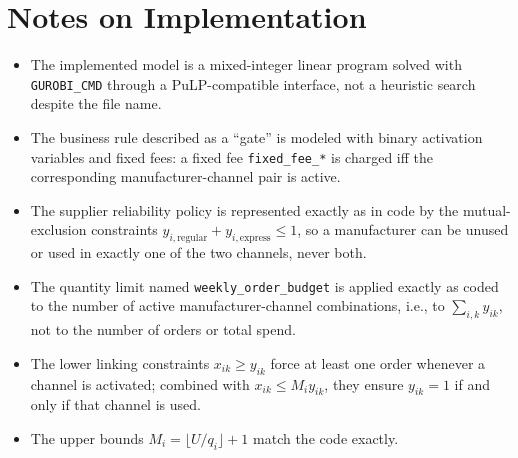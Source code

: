 \section*{Notes on Implementation}

\begin{itemize}
    \item The implemented model is a mixed-integer linear program solved with \texttt{GUROBI\_CMD} through a PuLP-compatible interface, not a heuristic search despite the file name.
    \item The business rule described as a ``gate'' is modeled with binary activation variables and fixed fees: a fixed fee \texttt{fixed\_fee\_*} is charged iff the corresponding manufacturer-channel pair is active.
    \item The supplier reliability policy is represented exactly as in code by the mutual-exclusion constraints
    \(
    y_{i,\mathrm{regular}} + y_{i,\mathrm{express}} \le 1
    \),
    so a manufacturer can be unused or used in exactly one of the two channels, never both.
    \item The quantity limit named \texttt{weekly\_order\_budget} is applied exactly as coded to the number of active manufacturer-channel combinations, i.e., to \(\sum_{i,k} y_{ik}\), not to the number of orders or total spend.
    \item The lower linking constraints \(x_{ik}\ge y_{ik}\) force at least one order whenever a channel is activated; combined with \(x_{ik}\le M_i y_{ik}\), they ensure \(y_{ik}=1\) if and only if that channel is used.
    \item The upper bounds \(M_i=\lfloor U/q_i\rfloor+1\) match the code exactly.
\end{itemize}
